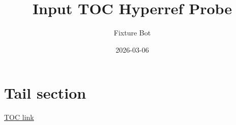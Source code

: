 \documentclass{article}
\title{Input TOC Hyperref Probe}
\author{Fixture Bot}
\date{2026-03-06}
\begin{document}
\maketitle
\tableofcontents

\section{Tail section}
\href{https://example.com/toc}{TOC link}
\end{document}
